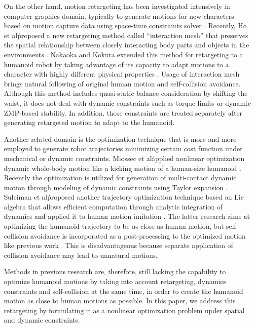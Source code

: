\documentclass[letterpaper, 10 pt, conference]{ieeeconf}  %
\begin{document}
On the other hand, motion retargeting has been investigated
intensively in computer graphics domain, typically to generate motions
for new characters based on motion capture data using space-time
constraints solver \cite{Gleicher98}.  Recently, Ho et al\. proposed a
new retargeting method called ``interaction mesh'' that preserves the
spatial relationship between closely interacting body parts and
objects in the environments \cite{Komura10}.  Nakaoka and Kokura
extended this method for retargeting to a humanoid robot by taking
advantage of its capacity to adapt motions to a character with highly
different physical properties \cite{Nakaoka12Humanoids}. Usage of
interaction mesh brings natural following of original human motion and
self-collision avoidance.  Although this method includes quasi-static
balance consideration by shifting the waist, it does not deal with
dynamic constraints such as torque limits or dynamic ZMP-based
stability. In addition, those constraints are treated separately after
generating retargeted motion to adapt to the humanoid.


Another related domain is the optimization technique that is more and
more employed to generate robot trajectories minimizing certain cost
function under mechanical or dynamic constraints. Miossec et
al\. applied nonlinear optimization dynamic whole-body motion like a
kicking motion of a human-size humanoid \cite{Miossec06ROBIO}.
Recently the optimization is utilized for generation of multi-contact
dynamic motion through modeling of dynamic constraints using Taylor
expansion \cite{Lengagne13IJRR}. Suleiman et al\. proposed another
trajectory optimization technique based on Lie algebra that allows
efficient computation through analytic integration of dynamics
\cite{Suleiman07Humanoids} and applied it to human motion imitation
\cite{Suleiman08ICRA}.  The latter research aims at optimizing the
humanoid trajectory to be as close as human motion, but self-collision
avoidance is incorporated as a post-processing to the optimized motion
like previous work \cite{Nakaoka12Humanoids}. This is disadvantageous
because separate application of collision avoidance may lead to
unnatural motions.


Methods in previous research are, therefore, still lacking the
capability to optimize humanoid motions by taking into account
retargeting, dynamics constraints and self-collision at the same time,
in order to create the humanoid motion as close to human motions as
possible. In this paper, we address this retargeting by formulating it
as a nonlinear optimization problem upder spatial and dynamic
constraints.
\end{document}
